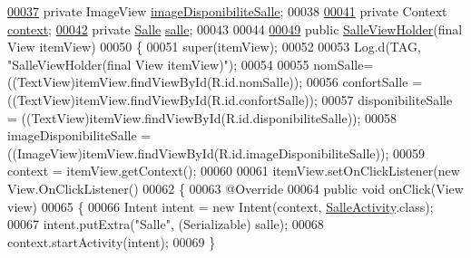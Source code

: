 \begin{DoxyCode}
\hyperlink{classcom_1_1lasalle_1_1meeting_1_1_salle_view_holder_aa062c074e992faadf2386744ea33034f}{00037}     \textcolor{keyword}{private} ImageView \hyperlink{classcom_1_1lasalle_1_1meeting_1_1_salle_view_holder_aa062c074e992faadf2386744ea33034f}{imageDisponibiliteSalle};                  
00038 
\hyperlink{classcom_1_1lasalle_1_1meeting_1_1_salle_view_holder_a7072e3d124129f260af7a24c7ad4277d}{00041}     \textcolor{keyword}{private} Context \hyperlink{classcom_1_1lasalle_1_1meeting_1_1_salle_view_holder_a7072e3d124129f260af7a24c7ad4277d}{context};                                    
\hyperlink{classcom_1_1lasalle_1_1meeting_1_1_salle_view_holder_afe85265c9d35c5035e96ace9c8032606}{00042}     \textcolor{keyword}{private} \hyperlink{classcom_1_1lasalle_1_1meeting_1_1_salle}{Salle} \hyperlink{classcom_1_1lasalle_1_1meeting_1_1_salle_view_holder_afe85265c9d35c5035e96ace9c8032606}{salle};                                        
00043 
00044 
\hyperlink{classcom_1_1lasalle_1_1meeting_1_1_salle_view_holder_ab123df6edb081221dc36daff6f8c1763}{00049}     \textcolor{keyword}{public} \hyperlink{classcom_1_1lasalle_1_1meeting_1_1_salle_view_holder_ab123df6edb081221dc36daff6f8c1763}{SalleViewHolder}(\textcolor{keyword}{final} View itemView)
00050     \{
00051         super(itemView);
00052 
00053         Log.d(TAG, \textcolor{stringliteral}{"SalleViewHolder(final View itemView)"});
00054 
00055         nomSalle= ((TextView)itemView.findViewById(R.id.nomSalle));
00056         confortSalle = ((TextView)itemView.findViewById(R.id.confortSalle));
00057         disponibiliteSalle = ((TextView)itemView.findViewById(R.id.disponibiliteSalle));
00058         imageDisponibiliteSalle = ((ImageView)itemView.findViewById(R.id.imageDisponibiliteSalle));
00059         context = itemView.getContext();
00060 
00061         itemView.setOnClickListener(\textcolor{keyword}{new} View.OnClickListener()
00062         \{
00063             @Override
00064             \textcolor{keyword}{public} \textcolor{keywordtype}{void} onClick(View view)
00065             \{
00066                 Intent intent = \textcolor{keyword}{new} Intent(context, \hyperlink{classcom_1_1lasalle_1_1meeting_1_1_salle_activity}{SalleActivity}.class);
00067                 intent.putExtra(\textcolor{stringliteral}{"Salle"}, (Serializable) salle);
00068                 context.startActivity(intent);
00069             \}

\end{DoxyCode}

